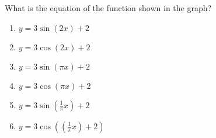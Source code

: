\item What is the equation of the function shown in the graph?


\begin{minipage}{0.4\columnwidth}
    \begin{enumerate}
        \item $y = 3 \sin (2x)+2$
        \item $y = 3\cos(2x)+2$
        \item $y=3\sin(\pi x)+2$
        \item $y = 3 \cos (\pi x) +2$
        \item $y=3 \sin (\frac{1}{\pi} x) +2$
        \item $y = 3 \cos((\frac{1}{\pi} x)+2)$
    \end{enumerate}
\end{minipage}
\begin{minipage}{0.6\columnwidth}
\end{minipage}

